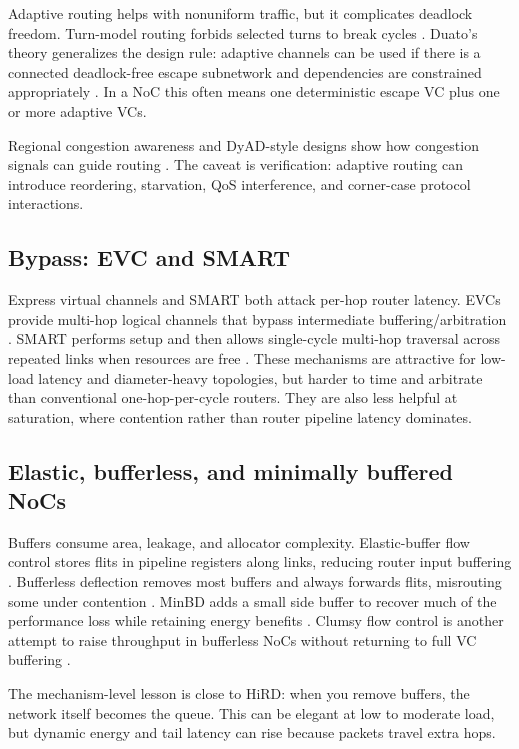 \documentclass[11pt]{article}
\begin{document}
Adaptive routing helps with nonuniform traffic, but it complicates deadlock freedom. Turn-model routing forbids selected turns to break cycles \cite{GlassNi1994,Chiu2000}. Duato's theory generalizes the design rule: adaptive channels can be used if there is a connected deadlock-free escape subnetwork and dependencies are constrained appropriately \cite{Duato1993}. In a NoC this often means one deterministic escape VC plus one or more adaptive VCs.

Regional congestion awareness and DyAD-style designs show how congestion signals can guide routing \cite{HuMarculescu2004,Gratz2008RCA}. The caveat is verification: adaptive routing can introduce reordering, starvation, QoS interference, and corner-case protocol interactions.

\subsection{Bypass: EVC and SMART}

Express virtual channels and SMART both attack per-hop router latency. EVCs provide multi-hop logical channels that bypass intermediate buffering/arbitration \cite{Kumar2007EVC}. SMART performs setup and then allows single-cycle multi-hop traversal across repeated links when resources are free \cite{Krishna2013SMART}. These mechanisms are attractive for low-load latency and diameter-heavy topologies, but harder to time and arbitrate than conventional one-hop-per-cycle routers. They are also less helpful at saturation, where contention rather than router pipeline latency dominates.

\subsection{Elastic, bufferless, and minimally buffered NoCs}

Buffers consume area, leakage, and allocator complexity. Elastic-buffer flow control stores flits in pipeline registers along links, reducing router input buffering \cite{Michelogiannakis2009Elastic}. Bufferless deflection removes most buffers and always forwards flits, misrouting some under contention \cite{Moscibroda2009,Fallin2011CHIPPER}. MinBD adds a small side buffer to recover much of the performance loss while retaining energy benefits \cite{Fallin2012MinBD}. Clumsy flow control is another attempt to raise throughput in bufferless NoCs without returning to full VC buffering \cite{Kim2013Clumsy}.

The mechanism-level lesson is close to HiRD: when you remove buffers, the network itself becomes the queue. This can be elegant at low to moderate load, but dynamic energy and tail latency can rise because packets travel extra hops.
\end{document}
